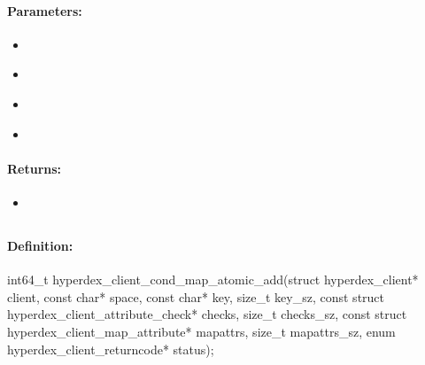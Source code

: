 \paragraph{Parameters:}
\begin{itemize}[noitemsep]
\item {}\\

\item {}\\

\item {}\\

\item {}\\

\end{itemize}

\paragraph{Returns:}
\begin{itemize}[noitemsep]
\item {}\\

\end{itemize}

\pagebreak
\subsection{}
\label{api:c:cond_map_atomic_add}


\paragraph{Definition:}
\begin{ccode}
int64_t hyperdex_client_cond_map_atomic_add(struct hyperdex_client* client,
        const char* space,
        const char* key, size_t key_sz,
        const struct hyperdex_client_attribute_check* checks, size_t checks_sz,
        const struct hyperdex_client_map_attribute* mapattrs, size_t mapattrs_sz,
        enum hyperdex_client_returncode* status);
\end{ccode}

